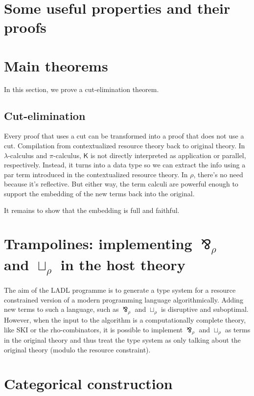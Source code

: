 \documentclass{llncs}
\renewcommand{\:}{\colon}
\newcommand{\pic}{$\pi$-calculus}
\newcommand{\lamc}{$\lambda$-calculus}
\begin{document}
\section{Some useful properties and their proofs}

\section{Main theorems}
In this section, we prove a cut-elimination theorem.
\subsection{Cut-elimination}
Every proof that uses a cut can be transformed into a proof that does
not use a cut.  Compilation from contextualized resource theory back
to original theory. In {\lamc} and {\pic}, $\mathsf{K}$ is
not directly interpreted as application or parallel,
respectively. Instead, it turns into a data type so we can extract the
info using a par term introduced in the contextualized resource
theory.  In $\rho$, there's no need because it's reflective.  But either
way, the term calculi are powerful enough to support the embedding of
the new terms back into the original.

It remains to show that the embedding is full and faithful. 

\section{Trampolines: implementing $\bindnasrepma_{\rho}$ and $\sqcup_{\rho}$ in the host theory}

The aim of the LADL programme is to generate a type system for a resource constrained version of a modern programming language algorithmically. Adding new terms to such a language, such as $\bindnasrepma_{\rho}$ and $\sqcup_{\rho}$ is disruptive and suboptimal. However, when the input to the algorithm is a computationally complete theory, like SKI or the rho-combinators, it is possible to implement $\bindnasrepma_{\rho}$ and $\sqcup_{\rho}$ as terms in the original theory and thus treat the type system as only talking about the original theory (modulo the resource constraint).

\section{Categorical construction}



\end{document}
